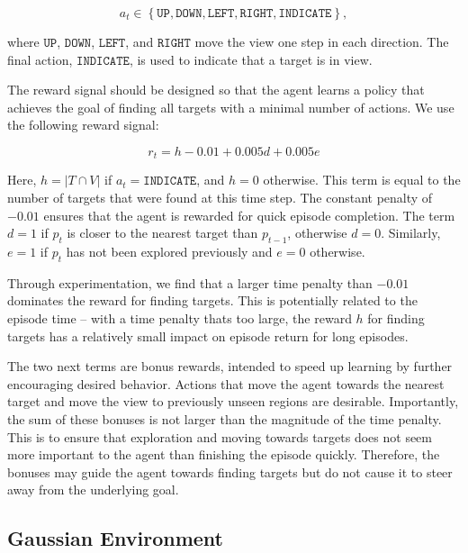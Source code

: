 \begin{equation}
    a_t \in \left\lbrace \mathtt{UP}, \mathtt{DOWN}, \mathtt{LEFT}, \mathtt{RIGHT}, \mathtt{INDICATE} \right\rbrace,
\end{equation}

where \(\mathtt{UP}\), \(\mathtt{DOWN}\), \(\mathtt{LEFT}\), and \(\mathtt{RIGHT}\) move the view one step in each direction.
The final action, \(\mathtt{INDICATE}\), is used to indicate that a target is in view.

The reward signal should be designed so that the agent learns a policy that achieves the goal of finding all targets with a minimal number of actions.
We use the following reward signal:

\begin{equation}
    r_t = h - 0.01 + 0.005d + 0.005e
\end{equation}

Here, \(h = \left\lvert T \cap V \right\rvert\) if \(a_t = \mathtt{INDICATE}\), and \(h = 0\) otherwise.
This term is equal to the number of targets that were found at this time step.
The constant penalty of \(-0.01\) ensures that the agent is rewarded for quick episode completion.
The term \(d = 1\) if \(p_t\) is closer to the nearest target than \(p_{t-1}\), otherwise \(d = 0\).
Similarly, \(e = 1\) if \(p_t\) has not been explored previously and \(e = 0\) otherwise.

Through experimentation, we find that a larger time penalty than \(-0.01\) dominates the reward for finding targets.
This is potentially related to the episode time -- with a time penalty thats too large, the reward \(h\) for finding targets has a relatively small impact on episode return for long episodes.

The two next terms are bonus rewards, intended to speed up learning by further encouraging desired behavior.
Actions that move the agent towards the nearest target and move the view to previously unseen regions are desirable.
Importantly, the sum of these bonuses is not larger than the magnitude of the time penalty.
This is to ensure that exploration and moving towards targets does not seem more important to the agent than finishing the episode quickly.
Therefore, the bonuses may guide the agent towards finding targets but do not cause it to steer away from the underlying goal.

\subsection{Gaussian Environment}

